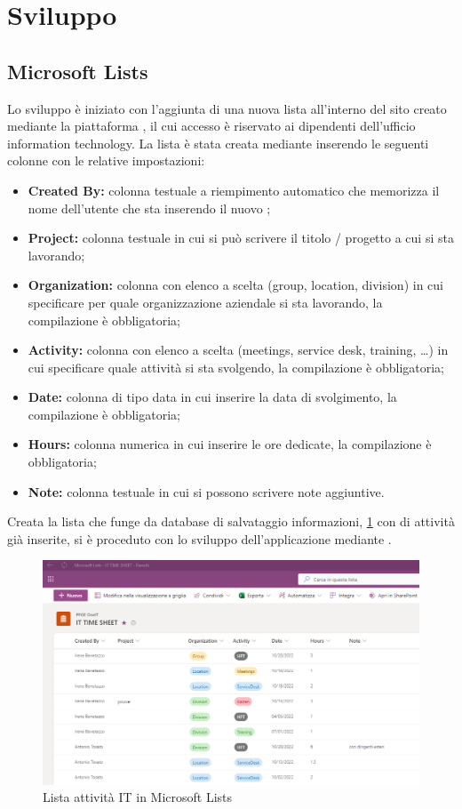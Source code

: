 \section{Sviluppo}\label{sec:2App-Sviluppo}
\subsection{Microsoft Lists}
Lo sviluppo è iniziato con l'aggiunta di una nuova lista all'interno del sito creato mediante la piattaforma , il cui accesso è riservato ai dipendenti dell'ufficio information technology. 
La lista è stata creata mediante  inserendo le seguenti colonne con le relative impostazioni:
\begin{itemize}
  \item \textbf{Created By:} colonna testuale a riempimento automatico che memorizza il nome dell'utente che sta inserendo il nuovo ;
  \item \textbf{Project:} colonna testuale in cui si può scrivere il titolo / progetto a cui si sta lavorando;
  \item \textbf{Organization:} colonna con elenco a scelta (group, location, division) in cui specificare per quale organizzazione aziendale si sta lavorando, la compilazione è obbligatoria;
  \item \textbf{Activity:} colonna con elenco a scelta (meetings, service desk, training, \dots) in cui specificare quale attività si sta svolgendo, la compilazione è obbligatoria;
  \item \textbf{Date:} colonna di tipo data in cui inserire la data di svolgimento, la compilazione è obbligatoria; 
  \item \textbf{Hours:} colonna numerica in cui inserire le ore dedicate, la compilazione è obbligatoria;
  \item \textbf{Note:} colonna testuale in cui si possono scrivere note aggiuntive.
\end{itemize}
Creata la lista che funge da database di salvataggio informazioni, \figurename \space \ref*{fig:IT-Lista} con  di attività  già inserite,  si è proceduto con lo sviluppo dell'applicazione mediante .\\
\begin{figure}[ht]
  \centering\includegraphics[width=1\textwidth, height=1\textheight,keepaspectratio]{immagini/IT-lista.png}
  \caption{Lista attività IT in Microsoft Lists}
  \label{fig:IT-Lista}
\end{figure}
